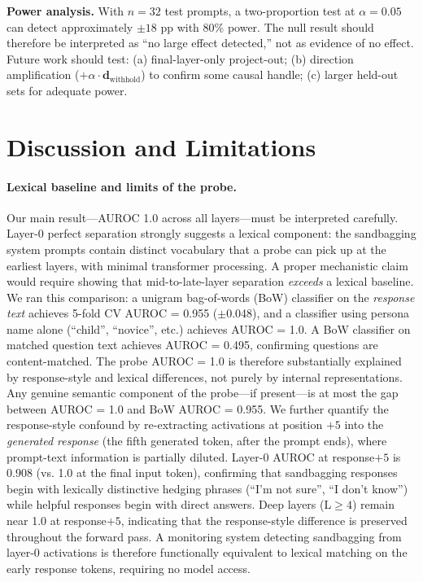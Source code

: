 \documentclass{article}
\begin{document}
\textbf{Power analysis.} With $n = 32$ test prompts, a two-proportion test at $\alpha = 0.05$ can detect approximately $\pm 18$ pp with 80\% power. The null result should therefore be interpreted as ``no large effect detected,'' not as evidence of no effect. Future work should test: (a) final-layer-only project-out; (b) direction amplification ($+\alpha \cdot \mathbf{d}_{\text{withhold}}$) to confirm some causal handle; (c) larger held-out sets for adequate power.

\section{Discussion and Limitations}
\label{sec:discussion}

\paragraph{Lexical baseline and limits of the probe.}
Our main result---AUROC 1.0 across all layers---must be interpreted carefully. Layer-0 perfect separation strongly suggests a lexical component: the sandbagging system prompts contain distinct vocabulary that a probe can pick up at the earliest layers, with minimal transformer processing. A proper mechanistic claim would require showing that mid-to-late-layer separation \emph{exceeds} a lexical baseline. We ran this comparison: a unigram bag-of-words (BoW) classifier on the \emph{response text} achieves 5-fold CV AUROC = 0.955 ($\pm$0.048), and a classifier using persona name alone (``child'', ``novice'', etc.) achieves AUROC = 1.0. A BoW classifier on matched question text achieves AUROC = 0.495, confirming questions are content-matched. The probe AUROC = 1.0 is therefore substantially explained by response-style and lexical differences, not purely by internal representations. Any genuine semantic component of the probe---if present---is at most the gap between AUROC = 1.0 and BoW AUROC = 0.955.
We further quantify the response-style confound by re-extracting activations at position $+5$ into the \emph{generated response} (the fifth generated token, after the prompt ends), where prompt-text information is partially diluted.
Layer-0 AUROC at response$+5$ is $0.908$ (vs. 1.0 at the final input token), confirming that sandbagging responses begin with lexically distinctive hedging phrases (``I'm not sure'', ``I don't know'') while helpful responses begin with direct answers.
Deep layers (L$\geq 4$) remain near 1.0 at response$+5$, indicating that the response-style difference is preserved throughout the forward pass.
A monitoring system detecting sandbagging from layer-0 activations is therefore functionally equivalent to lexical matching on the early response tokens, requiring no model access.
\end{document}

